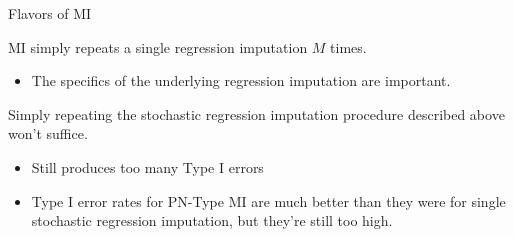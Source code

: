 \documentclass{beamer}\usepackage[]{graphicx}\usepackage[]{color}
\begin{document}
\begin{frame}[fragile]{Flavors of MI}
  
  MI simply repeats a single regression imputation $M$ times.
  \begin{itemize}
  \item The specifics of the underlying regression imputation are important.
  \end{itemize}
  \vb
  \pause
  Simply repeating the stochastic regression imputation procedure described 
  above won't suffice.
  \begin{itemize}
  \item Still produces too many Type I errors
  \end {itemize}
  
\begin{table}[ht]
\centering
{}
\caption{Mean Correlation Coefficients and Type I Error Rates} 
\end{table}


\begin{itemize}
\item Type I error rates for PN-Type MI are much better than they were for 
  single stochastic regression imputation, but they're still too high.
\end{itemize}

\end{frame}

\end{document}
